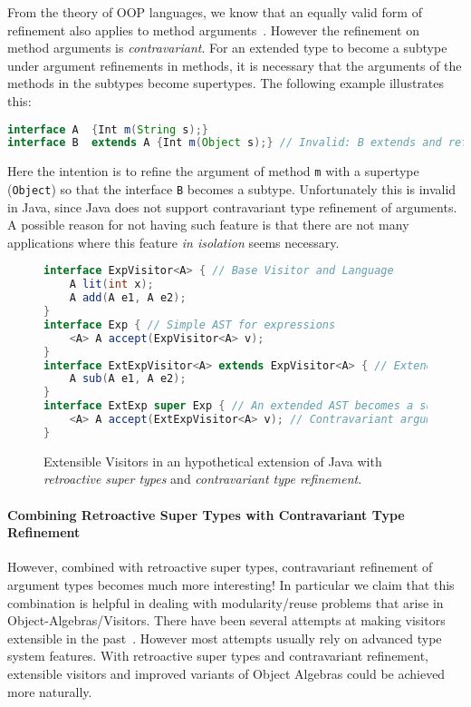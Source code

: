 \noindent From the theory of OOP languages, we know that an equally valid form
of refinement also applies to method arguments~\cite{cardelli1984semantics}.
However the refinement on method arguments is \emph{contravariant}. For an extended
type to become a subtype under argument refinements in methods, it is necessary
that the arguments of the methods in the subtypes become supertypes. The
following example illustrates this:

\begin{lstlisting}[language=java]
interface A  {Int m(String s);} 
interface B  extends A {Int m(Object s);} // Invalid: B extends and refines the argument type of m()
\end{lstlisting}

\noindent Here the intention is to refine the argument of method
\lstinline{m} with a supertype (\lstinline{Object}) so that the
interface \lstinline{B} becomes a subtype. Unfortunately this is invalid in Java, since Java
does not support contravariant type refinement of arguments. 
A possible reason for not having such feature is that there are not
many applications where this feature \emph{in isolation} seems necessary. 

\begin{figure}
\begin{lstlisting}[language=java]
interface ExpVisitor<A> { // Base Visitor and Language
	A lit(int x);
	A add(A e1, A e2);
}
interface Exp { // Simple AST for expressions
	<A> A accept(ExpVisitor<A> v);
}
interface ExtExpVisitor<A> extends ExpVisitor<A> { // Extended Visitor and Language
	A sub(A e1, A e2);
}
interface ExtExp super Exp { // An extended AST becomes a supertype of the original one
	<A> A accept(ExtExpVisitor<A> v); // Contravariant argument refinement
}
\end{lstlisting}
\caption{Extensible Visitors in an hypothetical
  extension of Java with \emph{retroactive super types} and \emph{contravariant
  type refinement}.}
\label{fig:JVis}
\end{figure}

\paragraph{Combining Retroactive Super Types with Contravariant Type Refinement}

However, combined with retroactive super types, contravariant refinement of
argument types becomes much more interesting! In particular we claim that this
combination is helpful in dealing with modularity/reuse problems that arise in
Object-Algebras/Visitors. There have been several attempts at making visitors
extensible in the past~\cite{oliveira09modular,togersen:2004}. However most
attempts usually rely on advanced type system features. With retroactive super
types and contravariant refinement, extensible visitors and improved variants of
Object Algebras could be achieved more naturally.


